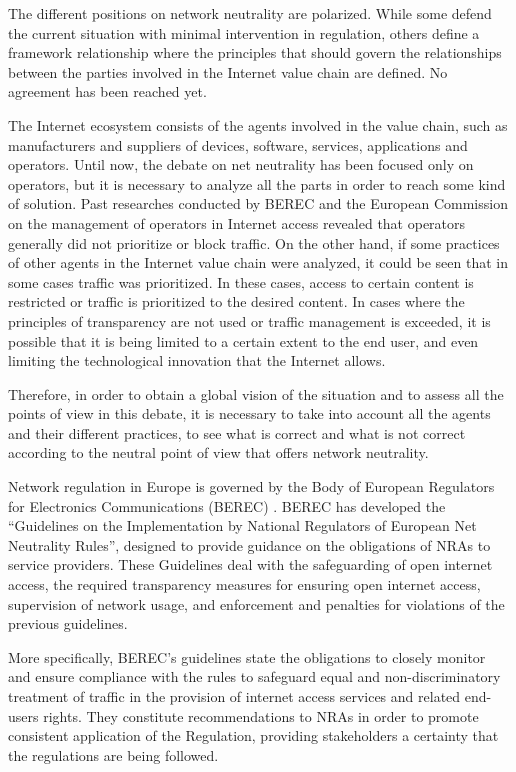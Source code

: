 \documentclass[journal]{IEEEtran}
\begin{document}
The different positions on network neutrality are polarized. While some defend the current situation with minimal intervention in regulation, others define a framework relationship where the principles that should govern the relationships between the parties involved in the Internet value chain are defined. No agreement has been reached yet.

The Internet ecosystem consists of the agents involved in the value chain, such as manufacturers and suppliers of devices, software, services, applications and operators. Until now, the debate on net neutrality has been focused only on operators, but it is necessary to analyze all the parts in order to reach some kind of solution. Past researches conducted by BEREC and the European Commission on the management of operators in Internet access revealed that operators generally did not prioritize or block traffic. On the other hand, if some practices of other agents in the Internet value chain were analyzed, it could be seen that in some cases traffic was prioritized. In these cases, access to certain content is restricted or traffic is prioritized to the desired content. In cases where the principles of transparency are not used or traffic management is exceeded, it is possible that it is being limited to a certain extent to the end user, and even limiting the technological innovation that the Internet allows.

Therefore, in order to obtain a global vision of the situation and to assess all the points of view in this debate, it is necessary to take into account all the agents and their different practices, to see what is correct and what is not correct according to the neutral point of view that offers network neutrality.

Network regulation in Europe is governed by the Body of European Regulators for Electronics Communications (BEREC) \cite{BEREC}. BEREC has developed the \enquote{Guidelines on the Implementation by National Regulators of European Net Neutrality Rules}, designed to provide guidance on the obligations of NRAs to service providers. These Guidelines deal with the safeguarding of open internet access, the required transparency measures for ensuring open internet access, supervision of network usage, and enforcement and penalties for violations of the previous guidelines.

More specifically, BEREC's guidelines state the obligations to closely monitor and ensure compliance with the rules to safeguard equal and non-discriminatory treatment of traffic in the provision of internet access services and related end-users rights. They constitute recommendations to NRAs in order to promote consistent application of the Regulation, providing stakeholders a certainty that the regulations are being followed.
\end{document}
